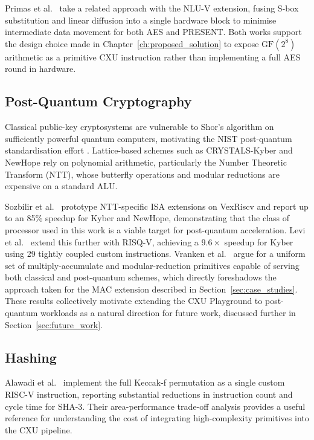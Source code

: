 Primas et al.~\cite{Primas2024NLUV} take a related approach with the NLU-V
extension, fusing S-box substitution and linear diffusion into a single hardware
block to minimise intermediate data movement for both AES and PRESENT.
Both works support the design choice made in Chapter~\ref{ch:proposed_solution}
to expose $\text{GF}(2^8)$ arithmetic as a primitive CXU instruction rather than
implementing a full AES round in hardware.

\subsection{Post-Quantum Cryptography}
\label{subsec:related_pqc}

Classical public-key cryptosystems are vulnerable to Shor's algorithm on sufficiently
powerful quantum computers, motivating the NIST post-quantum standardisation effort
\cite{Vranken2023UniformMul, Levi2020RISQV}.
Lattice-based schemes such as CRYSTALS-Kyber and NewHope rely on polynomial arithmetic,
particularly the Number Theoretic Transform (NTT), whose butterfly operations and
modular reductions are expensive on a standard ALU.

Sozbilir et al.~\cite{Sozbilir2020Kyber} prototype NTT-specific ISA extensions on
VexRiscv and report up to an 85\% speedup for Kyber and NewHope, demonstrating
that the class of processor used in this work is a viable target for post-quantum
acceleration.
Levi et al.~\cite{Levi2020RISQV} extend this further with RISQ-V, achieving a
$9.6\times$ speedup for Kyber using 29 tightly coupled custom instructions.
Vranken et al.~\cite{Vranken2023UniformMul} argue for a uniform set of
multiply-accumulate and modular-reduction primitives capable of serving both
classical and post-quantum schemes, which directly foreshadows the approach taken
for the MAC extension described in Section~\ref{sec:case_studies}.
These results collectively motivate extending the CXU Playground to post-quantum
workloads as a natural direction for future work, discussed further in
Section~\ref{sec:future_work}.

\subsection{Hashing}
\label{subsec:related_hashing}

Alawadi et al.~\cite{Alawadi2025SHA3} implement the full Keccak-f permutation as a
single custom RISC-V instruction, reporting substantial reductions in instruction count
and cycle time for SHA-3.
Their area-performance trade-off analysis provides a useful reference for understanding
the cost of integrating high-complexity primitives into the CXU pipeline.


